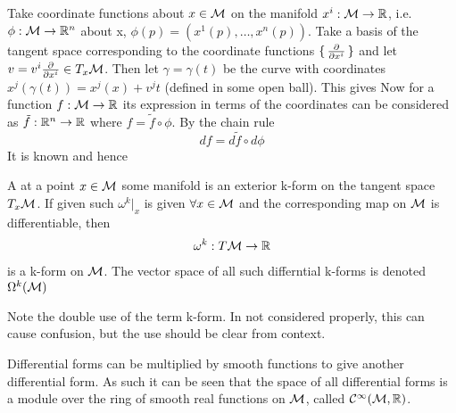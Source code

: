\documentclass{article}
\begin{document}
\begin{example}
Take coordinate functions about $x\in\mathcal{M}$ on the manifold $x^i : \mathcal{M} \to \mathbb{R}$, i.e. $\phi:\mathcal{M}\to\mathbb{R}^n$ about x, $\phi(p)=(x^1(p),\dots,x^n(p))$. Take a basis of the tangent space corresponding to the coordinate functions $\set{ \frac{\partial}{\partial x^i} }$ and let $v=v^i \frac{\partial}{\partial x^i}\in T_x \mathcal{M}$. Then let $\gamma=\gamma(t)$ be the curve with coordinates $x^j(\gamma(t)) = x^j(x) + v^j t $ (defined in some open ball). This gives
Now for a function $f:\mathcal{M}\to\mathbb{R}$ its expression in terms of the coordinates can be considered as $\tilde{f}:\mathbb{R}^n \to \mathbb{R}$ where $f=\tilde{f} \circ \phi$. By the chain rule 
\[
df = d\tilde{f} \circ d\phi
\]
It is known 
and hence 
\end{example}

\begin{definition}
A  at a point $x\in\mathcal{M}$ some manifold is an exterior k-form on the tangent space $T_x\mathcal{M}$. If given such $\omega^k\rvert_x$ is given $\forall x\in \mathcal{M}$ and the corresponding map on $\mathcal{M}$ is differentiable, then
\begin{align*}
    \omega^k : T\mathcal{M} \to \mathbb{R}
\end{align*}
is a k-form on $\mathcal{M}$. The vector space of all such differntial k-forms is denoted $\Omega^k(\mathcal{M})$
\end{definition}

\begin{remark}
Note the double use of the term k-form. In not considered properly, this can cause confusion, but the use should be clear from context. 
\end{remark}

\begin{fact}
Differential forms can be multiplied by smooth functions to give another differential form. As such it can be seen that the space of all differential forms is a module over the ring of smooth real functions on $\mathcal{M}$, called $\mathcal{C}^\infty(\mathcal{M},\mathbb{R})$.
\end{fact}
\end{document}
